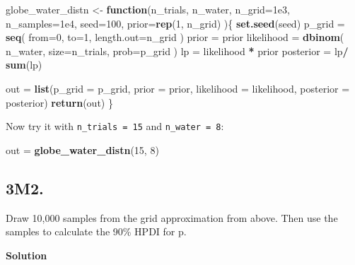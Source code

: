 \documentclass[
]{book}
\newenvironment{Shaded}{\begin{snugshade}}{\end{snugshade}}
\newcommand{\ControlFlowTok}[1]{\textcolor[rgb]{0.13,0.29,0.53}{\textbf{#1}}}
\newcommand{\DataTypeTok}[1]{\textcolor[rgb]{0.13,0.29,0.53}{#1}}
\newcommand{\DecValTok}[1]{\textcolor[rgb]{0.00,0.00,0.81}{#1}}
\newcommand{\FloatTok}[1]{\textcolor[rgb]{0.00,0.00,0.81}{#1}}
\newcommand{\KeywordTok}[1]{\textcolor[rgb]{0.13,0.29,0.53}{\textbf{#1}}}
\newcommand{\NormalTok}[1]{#1}
\newcommand{\OperatorTok}[1]{\textcolor[rgb]{0.81,0.36,0.00}{\textbf{#1}}}
\newcommand{\StringTok}[1]{\textcolor[rgb]{0.31,0.60,0.02}{#1}}
\begin{document}
\begin{Shaded}
\begin{Highlighting}[]
\NormalTok{globe_water_distn <-}\StringTok{ }\ControlFlowTok{function}\NormalTok{(n_trials, n_water, }\DataTypeTok{n_grid=}\FloatTok{1e3}\NormalTok{, }\DataTypeTok{n_samples=}\FloatTok{1e4}\NormalTok{, }\DataTypeTok{seed=}\DecValTok{100}\NormalTok{, }\DataTypeTok{prior=}\KeywordTok{rep}\NormalTok{(}\DecValTok{1}\NormalTok{, n_grid) )\{}
    \KeywordTok{set.seed}\NormalTok{(seed)}
\NormalTok{    p_grid =}\StringTok{ }\KeywordTok{seq}\NormalTok{( }\DataTypeTok{from=}\DecValTok{0}\NormalTok{, }\DataTypeTok{to=}\DecValTok{1}\NormalTok{, }\DataTypeTok{length.out=}\NormalTok{n_grid )  }
\NormalTok{    prior =}\StringTok{ }\NormalTok{prior  }
\NormalTok{    likelihood =}\StringTok{ }\KeywordTok{dbinom}\NormalTok{( n_water, }\DataTypeTok{size=}\NormalTok{n_trials, }\DataTypeTok{prob=}\NormalTok{p_grid ) }
\NormalTok{    lp =}\StringTok{ }\NormalTok{likelihood }\OperatorTok{*}\StringTok{ }\NormalTok{prior  }
\NormalTok{    posterior =}\StringTok{ }\NormalTok{lp}\OperatorTok{/}\StringTok{ }\KeywordTok{sum}\NormalTok{(lp)}
    
\NormalTok{    out =}\StringTok{ }\KeywordTok{list}\NormalTok{(}\DataTypeTok{p_grid =}\NormalTok{ p_grid, }\DataTypeTok{prior =}\NormalTok{ prior, }\DataTypeTok{likelihood =}\NormalTok{ likelihood, }\DataTypeTok{posterior =}\NormalTok{ posterior)}
    \KeywordTok{return}\NormalTok{(out)}
\NormalTok{\}}
\end{Highlighting}
\end{Shaded}

Now try it with \texttt{n\_trials\ =\ 15} and \texttt{n\_water\ =\ 8}:

\begin{Shaded}
\begin{Highlighting}[]
\NormalTok{out =}\StringTok{ }\KeywordTok{globe_water_distn}\NormalTok{(}\DecValTok{15}\NormalTok{, }\DecValTok{8}\NormalTok{)}
\end{Highlighting}
\end{Shaded}

\hypertarget{m2.}{%
\subsection{3M2.}\label{m2.}}

Draw 10,000 samples from the grid approximation from above. Then use the samples to calculate the 90\% HPDI for p.~

\textbf{Solution}
\end{document}

